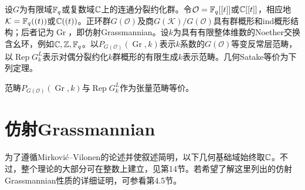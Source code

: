 设$G$为有限域$\mathbb{F}_q$或复数域$\mathbb{C}$上的连通分裂约化群。令$\mathcal O=\mathbb{F}_q[[t]]$或$\mathbb{C}[[t]]$，相应地$\mathcal K=\mathbb{F}_q((t))$或$\mathbb{C}((t))$。正环群$G(\mathcal O)$及商$G(\mathcal K)/G(\mathcal O)$具有群概形和ind概形结构；后者记为$\operatorname{Gr}$，即仿射Grassmannian。设$k$为具有有限整体维数的Noether交换含幺环，例如$\mathbb{C},\mathbb{Z},\mathbb{F}_q$。以$P_{G(\mathcal O)}(\operatorname{Gr},k)$表示$k$系数的$G(\mathcal O)$等变反常层范畴，以$\operatorname{Rep}G^L_k$表示对偶分裂约化$k$群概形的有限生成$k$表示范畴。几何Satake等价为下列定理。
\begin{theorem}\label{L21S0O1}
范畴$P_{G(\mathcal O)}(\operatorname{Gr},k)$与$\operatorname{Rep}G^L_k$作为张量范畴等价。
\end{theorem}
\section{仿射Grassmannian}\label{L21S1}
为了遵循Mirković–Vilonen的论述并使叙述简明，以下几何基础域始终取$\mathbb{C}$。不过，整个理论的大部分可在整数上建立，见第14节。若希望了解这里列出的仿射Grassmannian性质的详细证明，可参看第4.5节。

